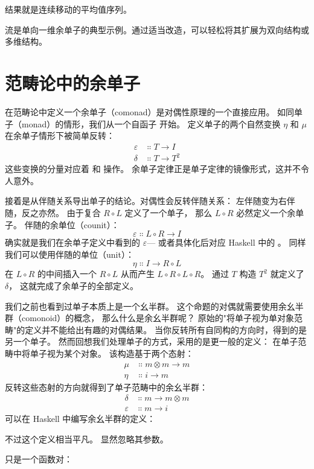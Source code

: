 结果就是连续移动的平均值序列。

流是单向一维余单子的典型示例。通过适当改造，可以轻松将其扩展为双向结构或多维结构。

\section{范畴论中的余单子}

在范畴论中定义一个余单子（comonad）是对偶性原理的一个直接应用。
如同单子（monad）的情形，我们从一个自函子  开始。
定义单子的两个自然变换 $\eta$ 和 $\mu$ 在余单子情形下被简单反转：
\begin{align*}
  \varepsilon & \Colon T \to I   \\
  \delta      & \Colon T \to T^2
\end{align*}
这些变换的分量对应着  和  操作。
余单子定律正是单子定律的镜像形式，这并不令人意外。

接着是从伴随关系导出单子的结论。对偶性会反转伴随关系：
左伴随变为右伴随，反之亦然。
由于复合 $R \circ L$ 定义了一个单子，
那么 $L \circ R$ 必然定义一个余单子。
伴随的余单位（counit）：
$$\varepsilon \Colon L \circ R \to I$$
确实就是我们在余单子定义中看到的 $\varepsilon$---
或者具体化后对应 Haskell 中的 。
同样我们可以使用伴随的单位（unit）：
$$\eta \Colon I \to R \circ L$$
在 $L \circ R$ 的中间插入一个 $R \circ L$
从而产生 $L \circ R \circ L \circ R$。
通过 $T$ 构造 $T^2$ 就定义了 $\delta$，
这就完成了余单子的全部定义。

我们之前也看到过单子本质上是一个幺半群。
这个命题的对偶就需要使用余幺半群（comonoid）的概念，
那么什么是余幺半群呢？
原始的"将单子视为单对象范畴"的定义并不能给出有趣的对偶结果。
当你反转所有自同构的方向时，得到的是另一个单子。
然而回想我们处理单子的方式，采用的是更一般的定义：
在单子范畴中将单子视为某个对象。
该构造基于两个态射：
\begin{align*}
  \mu  & \Colon m \otimes m \to m \\
  \eta & \Colon i \to m
\end{align*}
反转这些态射的方向就得到了单子范畴中的余幺半群：
\begin{align*}
  \delta      & \Colon m \to m \otimes m \\
  \varepsilon & \Colon m \to i
\end{align*}
可以在 Haskell 中编写余幺半群的定义：

不过这个定义相当平凡。 显然忽略其参数。

 只是一个函数对：

